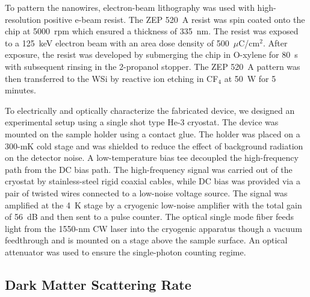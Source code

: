 \documentclass[twocolumn,10pt,prl,nofootinbib,preprintnumbers]{revtex4-1}
\begin{document}
To pattern the nanowires, electron-beam lithography was used with
high-resolution positive e-beam resist. The ZEP 520~A resist was spin
coated onto the chip at 5000~rpm which ensured a thickness of
335~nm. The resist was exposed to a 125~keV electron beam with an area
dose density of 500~$\mu$C/cm$^{2}$. After exposure, the resist was
developed by submerging the chip in O-xylene for 80~s with
subsequent rinsing in the 2-propanol stopper. The ZEP 520~A pattern
was then transferred to the WSi by reactive ion etching in CF$_4$ at
50~W for 5 minutes.

To electrically and optically characterize the fabricated device, we
designed an experimental setup using a single shot type He-3
cryostat. The device was mounted on the sample holder using a contact
glue. The holder was placed on a 300-mK cold stage and was
shielded to reduce the effect of background radiation on the detector
noise. A low-temperature bias tee decoupled the high-frequency path
from the DC bias path. The high-frequency signal was carried out of
the cryostat by stainless-steel rigid coaxial cables, while DC bias
was provided via a pair of twisted wires connected to a
low-noise voltage source. The signal was amplified at the 4~K stage by
a cryogenic low-noise amplifier with the total gain of 56~dB and then
sent to a pulse counter. The optical single mode fiber feeds light from the
1550-nm CW laser into the cryogenic apparatus though a vacuum
feedthrough and is mounted on a stage above the sample surface. An optical attenuator was used to ensure the single-photon counting regime.

\subsection{Dark Matter Scattering Rate}\label{app:ratescat}
%
\end{document}
